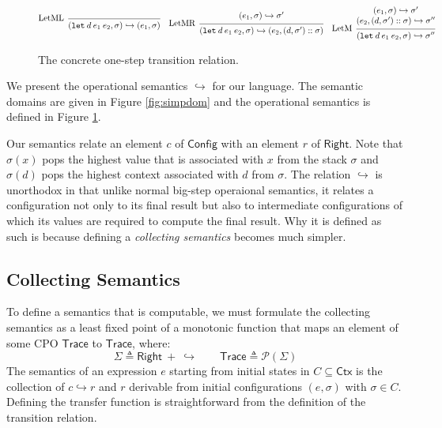 \documentclass[acmsmall,screen,review]{acmart}\settopmatter{printfolios=true,printccs=false,printacmref=false}
\theoremstyle{acmdefinition}
\newcommand*{\cons}{::}
\newcommand*{\pset}{\mathcal{P}}
\newcommand*{\modid}{d}
\newcommand*{\ctx}{\sigma}
\newcommand*{\Ctx}{\mathsf{Ctx}}
\newcommand*{\Trace}{\mathsf{Trace}}
\newcommand*{\Config}{\mathsf{Config}}
\newcommand*{\config}{c}
\newcommand*{\Right}{\mathsf{Right}}
\newcommand*{\rightst}{r}
\newcommand*{\semarrow}{\hookrightarrow}
\begin{document}
\begin{figure}[t!]
  \[
    \begin{prooftree}
      \infer[left label=LetML]0{
      (\mathtt{let}\:\modid\:e_{1}\:e_{2}, \ctx)
      \semarrow
      (e_{1}, \ctx)
      }
    \end{prooftree}\quad
    \begin{prooftree}
      \hypo{
        \begin{matrix}
          (e_{1}, \ctx)
          \semarrow
          \ctx'
        \end{matrix}
      }
      \infer[left label=LetMR]1{
      (\mathtt{let}\:\modid\:e_{1}\:e_{2}, \ctx)
      \semarrow
      (e_{2}, (\modid, \ctx')\cons \ctx)
      }
    \end{prooftree}\quad
    \begin{prooftree}
      \hypo{
        \begin{matrix}
          (e_{1}, \ctx)
          \semarrow
          \ctx' \\
          (e_{2}, (\modid, \ctx')\cons \ctx)
          \semarrow
          \ctx''
        \end{matrix}
      }
      \infer[left label=LetM]1{
      (\mathtt{let}\:\modid\:e_{1}\:e_{2}, \ctx)
      \semarrow
      \ctx''
      }
    \end{prooftree}
  \]
  \caption{The concrete one-step transition relation.}
  \label{fig:simpreach}
\end{figure}
We present the operational semantics $\semarrow$ for our language.
The semantic domains are given in Figure \ref{fig:simpdom} and the operational semantics is defined in Figure \ref{fig:simpreach}.

Our semantics relate an element $\config$ of $\Config$ with an element $\rightst$ of $\Right$.
Note that $\ctx(x)$ pops the highest value that is associated with $x$ from the stack $\ctx$ and $\ctx(\modid)$ pops the highest context associated with $\modid$ from $\ctx$.
The relation $\semarrow$ is unorthodox in that unlike normal big-step operaional semantics, it relates a configuration not only to its final result but also to intermediate configurations of which its values are required to compute the final result.
Why it is defined as such is because defining a \emph{collecting semantics} becomes much simpler.

\subsection{Collecting Semantics}
To define a semantics that is computable, we must formulate the collecting semantics as a least fixed point of a monotonic function that maps an element of some CPO $\Trace$ to $\Trace$, where:
\[\Sigma\triangleq\Right\:+\:\semarrow\qquad\Trace\triangleq\pset(\Sigma)\]
The semantics of an expression $e$ starting from initial states in $C\subseteq\Ctx$ is the collection of $\config\semarrow\rightst$ and $\rightst$ derivable from initial configurations $(e,\ctx)$ with $\ctx\in C$.
Defining the transfer function is straightforward from the definition of the transition relation.
\end{document}
